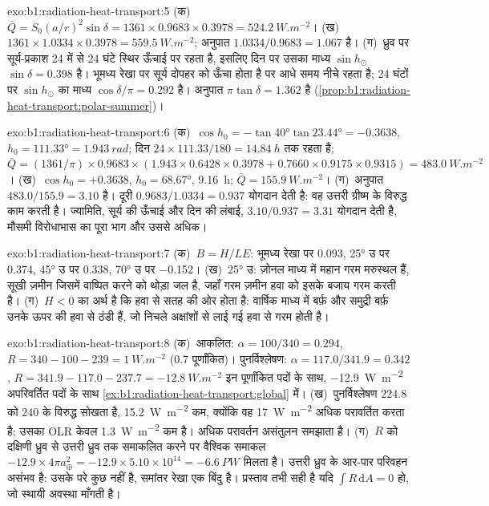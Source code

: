 \begin{solution}{exo:b1:radiation-heat-transport:5}
(क)~$\bar Q = S_0(a/r)^2\sin\delta = 1361 \times 0.9683 \times 0.3978 =
\qty{524.2}{W.m^{-2}}$। (ख)~$1361 \times 1.0334 \times 0.3978 =
\qty{559.5}{W.m^{-2}}$; अनुपात $1.0334/0.9683 = 1.067$ है। (ग)~ध्रुव पर सूर्य-प्रकाश 24 में से 24 घंटे स्थिर ऊँचाई पर रहता है, इसलिए दिन पर उसका माध्य $\sin h_\odot$
$\sin\delta = 0.398$ है। भूमध्य रेखा पर सूर्य दोपहर को ऊँचा होता है पर आधे समय नीचे रहता है; 24 घंटों पर $\sin h_\odot$ का माध्य $\cos\delta/\pi =
0.292$ है। अनुपात $\pi\tan\delta = 1.362$ है
(\cref{prop:b1:radiation-heat-transport:polar-summer})।
\end{solution}

\begin{solution}{exo:b1:radiation-heat-transport:6}
(क)~$\cos h_0 = -\tan\ang{40}\tan\ang{23.44} = -0.3638$, $h_0 = \ang{111.33} =
\qty{1.943}{rad}$; दिन $24 \times 111.33/180 = \qty{14.84}{h}$ तक रहता है; $\bar Q =
(1361/\pi) \times 0.9683 \times (1.943 \times 0.6428 \times 0.3978 + 0.7660 \times
0.9175 \times 0.9315) = \qty{483.0}{W.m^{-2}}$। (ख)~$\cos h_0 = +0.3638$, $h_0 =
\ang{68.67}$, \qty{9.16}{h}; $\bar Q = \qty{155.9}{W.m^{-2}}$। (ग)~अनुपात
$483.0/155.9 = 3.10$ है। दूरी $0.9683/1.0334 = 0.937$ योगदान देती है: वह उत्तरी ग्रीष्म के विरुद्ध काम करती है। ज्यामिति, सूर्य की ऊँचाई और दिन की लंबाई, $3.10/0.937 = 3.31$ योगदान देती है, मौसमी विरोधाभास का पूरा भाग और उससे अधिक।
\end{solution}

\begin{solution}{exo:b1:radiation-heat-transport:7}
(क)~$B = H/LE$: भूमध्य रेखा पर \num{0.093}, \ang{25} उ पर \num{0.374},
\ang{45} उ पर \num{0.338}, \ang{70} उ पर \num{-0.152}। (ख)~\ang{25} उ: ज़ोनल
माध्य में महान गरम मरुस्थल हैं, सूखी ज़मीन जिसमें वाष्पित करने को थोड़ा जल है, जहाँ गरम ज़मीन हवा को इसके बजाय गरम करती है। (ग)~$H < 0$ का अर्थ है कि  हवा से सतह की ओर होता है: वार्षिक माध्य में बर्फ़ और समुद्री बर्फ़ उनके ऊपर की हवा से ठंडी हैं, जो निचले अक्षांशों से लाई गई हवा से गरम होती है।
\end{solution}

\begin{solution}{exo:b1:radiation-heat-transport:8}
(क)~आकलित: $\alpha = 100/340 = 0.294$, $R = 340 - 100 - 239 =
\qty{+1}{W.m^{-2}}$ (\num{0.7} पूर्णांकित)। पुनर्विश्लेषण: $\alpha = 117.0/341.9 =
0.342$, $R = 341.9 - 117.0 - 237.7 = \qty{-12.8}{W.m^{-2}}$ इन पूर्णांकित पदों के साथ,
\qty{-12.9}{W.m^{-2}} अपरिवर्तित पदों के साथ \cref{ex:b1:radiation-heat-transport:global} में। (ख)~पुनर्विश्लेषण $224.8$ को $240$ के विरुद्ध सोखता है, \qty{15.2}{W.m^{-2}} कम, क्योंकि वह \qty{17}{W.m^{-2}} अधिक परावर्तित करता है; उसका OLR केवल \qty{1.3}{W.m^{-2}} कम है। अधिक परावर्तन असंतुलन समझाता है। (ग)~$R$ को दक्षिणी ध्रुव से उत्तरी ध्रुव तक समाकलित करने पर वैश्विक समाकल
$-12.9 \times 4\pi a_\oplus^2 = -12.9 \times
5.10\times10^{14} = \qty{-6.6}{PW}$ मिलता है। उत्तरी ध्रुव के आर-पार परिवहन असंभव है: उसके परे कुछ नहीं है, समांतर रेखा एक बिंदु है। प्रस्ताव तभी सही है यदि $\int R\,\mathrm dA = 0$ हो, जो स्थायी अवस्था माँगती है।
\end{solution}


